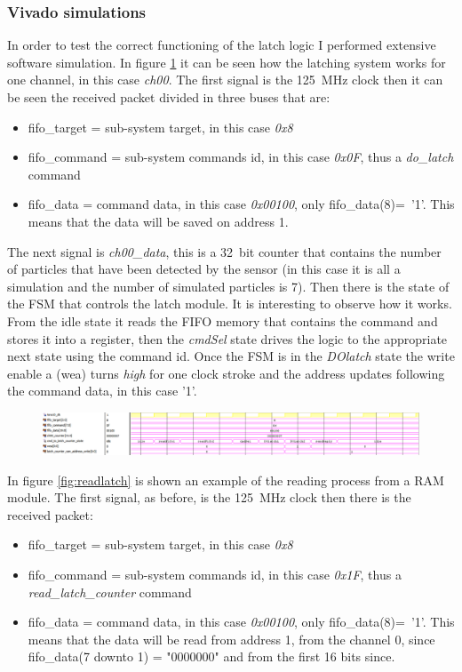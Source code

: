 \subsubsection{Vivado simulations}
\noindent In order to test the correct functioning of the latch logic I performed extensive software simulation. In figure \ref{fig:dolatch} it can be seen how the latching system works for one channel, in this case \textit{ch00}. The first signal is the 125~MHz clock then it can be seen the received packet divided in three buses that are:
\begin{itemize}
	\item fifo\_target = sub-system target, in this case \textit{0x8}
	\item fifo\_command = sub-system commands id, in this case \textit{0x0F}, thus a \textit{do\_latch} command
	\item fifo\_data = command data, in this case \textit{0x00100}, only fifo\_data(8)=~'1'. This means that the data will be saved on address 1.
\end{itemize} 
The next signal is \textit{ch00\_data}, this is a 32~bit counter that contains the number of particles that have been detected by the sensor (in this case it is all a simulation and the number of simulated particles is 7).
Then there is the state of the FSM that controls the latch module. It is interesting to observe how it works. From the idle state it reads the FIFO memory that contains the command and stores it into a register, then the \textit{cmdSel} state drives the logic to the appropriate next state using the command id.
Once the FSM is in the \textit{DOlatch} state the write enable a (wea) turns \textit{high} for one clock stroke and the address updates following the command data, in this case '1'.  
\begin{figure}[H]
	\centering
	\includegraphics[width=1.0\linewidth]{IMG/ch4/LATCHsimulations/DOLATCH}
	\caption{}
	\label{fig:dolatch}
\end{figure}
\noindent In figure \ref{fig:readlatch} is shown an example of the reading process from a RAM module. The first signal, as before, is the 125~MHz clock then there is the received packet:
\begin{itemize}
	\item fifo\_target = sub-system target, in this case \textit{0x8}
	\item fifo\_command = sub-system commands id, in this case \textit{0x1F}, thus a \textit{read\_latch\_counter} command
	\item fifo\_data = command data, in this case \textit{0x00100}, only fifo\_data(8)=~'1'. This means that the data will be read from address 1, from the channel 0, since fifo\_data(7 downto 1) = "0000000" and from the first 16 bits since.
\end{itemize}
